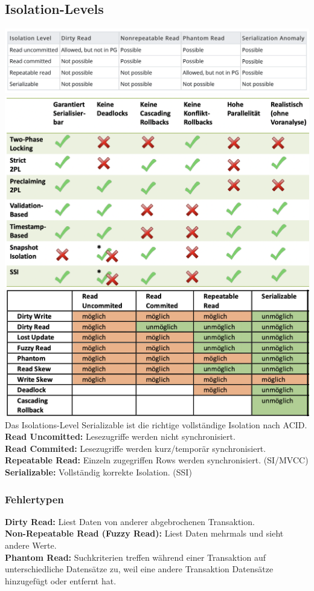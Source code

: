 \documentclass[7pt,landscape,a4paper]{scrartcl}
\begin{document}
\begin{multicols*}{4}
\subsection{Isolation-Levels}
\includegraphics[width=\linewidth]{isolationlevels}
\includegraphics[width=0.5\linewidth]{isolation}\\
\includegraphics[width=0.75\linewidth]{locks}\\
Das Isolations-Level Serializable ist die richtige vollständige Isolation nach ACID.\\
\textbf{Read Uncomitted:} Lesezugriffe werden nicht synchronisiert.\\
\textbf{Read Commited:} Lesezugriffe werden kurz/temporär synchronisiert.\\
\textbf{Repeatable Read:} Einzeln zugegriffen Rows werden synchronisiert. (SI/MVCC)\\
\textbf{Serializable:} Vollständig korrekte Isolation. (SSI)
\subsubsection{Fehlertypen}
\textbf{Dirty Read: } Liest Daten von anderer abgebrochenen Transaktion. \\
\textbf{Non-Repeatable Read (Fuzzy Read): } Liest Daten mehrmals und sieht andere Werte.\\
\textbf{Phantom Read:} Suchkriterien treffen während einer Transaktion auf unterschiedliche Datensätze zu, weil eine andere Transaktion Datensätze hinzugefügt oder entfernt hat.


\end{multicols*}
\end{document}
